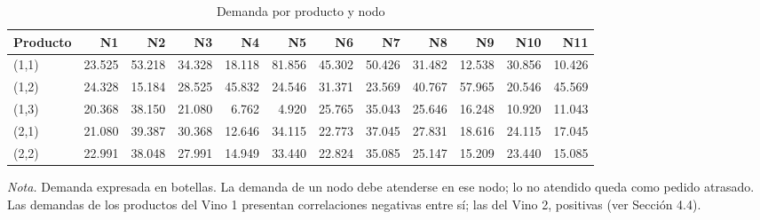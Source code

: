 \begin{table}[H]
  \centering
  \caption{Demanda por producto y nodo}
  \label{tab:anexoA-demanda}

  \small
  \setlength{\tabcolsep}{3pt} %
  \begin{tabular*}{\textwidth}{@{\extracolsep{\fill}} l *{11}{r} }
    \toprule
    \textbf{Producto} & \textbf{N1} & \textbf{N2} & \textbf{N3} & \textbf{N4} & \textbf{N5} & \textbf{N6} & \textbf{N7} & \textbf{N8} & \textbf{N9} & \textbf{N10} & \textbf{N11} \\
    \midrule
    (1,1) & 23.525 & 53.218 & 34.328 & 18.118 & 81.856 & 45.302 & 50.426 & 31.482 & 12.538 & 30.856 & 10.426 \\
    (1,2) & 24.328 & 15.184 & 28.525 & 45.832 & 24.546 & 31.371 & 23.569 & 40.767 & 57.965 & 20.546 & 45.569 \\
    (1,3) & 20.368 & 38.150 & 21.080 & 6.762  & 4.920  & 25.765 & 35.043 & 25.646 & 16.248 & 10.920 & 11.043 \\
    (2,1) & 21.080 & 39.387 & 30.368 & 12.646 & 34.115 & 22.773 & 37.045 & 27.831 & 18.616 & 24.115 & 17.045 \\
    (2,2) & 22.991 & 38.048 & 27.991 & 14.949 & 33.440 & 22.824 & 35.085 & 25.147 & 15.209 & 23.440 & 15.085 \\
    \bottomrule
  \end{tabular*}

  \vspace{0.6em}
  \raggedright \small \textit{Nota.} Demanda expresada en botellas. La demanda de un nodo debe atenderse en ese nodo; lo no atendido queda como pedido atrasado. Las demandas de los productos del Vino 1 presentan correlaciones negativas entre sí; las del Vino 2, positivas (ver Sección 4.4).
\end{table}

